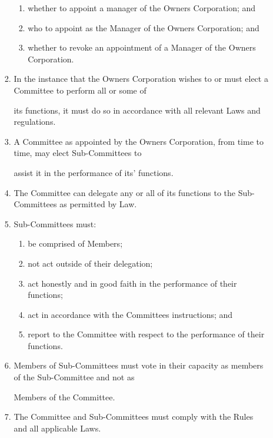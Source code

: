 \documentclass{article}
\begin{document}
\begin{enumerate}[label=\arabic*.]
\begin{enumerate}[label=\arabic{enumi}.\arabic*.]
\begin{enumerate}[label=(\arabic*)]
\begin{enumerate}[label=(\alph*)]
\item  whether to appoint a manager of the Owners Corporation; and 

\item  who to appoint as the Manager of the Owners Corporation; and 

\item  whether to revoke an appointment of a Manager of the Owners Corporation. 

\end{enumerate}
\item  In the instance that the Owners Corporation wishes to or must elect a Committee to perform all or some of 

its functions, it must do so in accordance with all relevant Laws and regulations. 

\item  A Committee as appointed by the Owners Corporation, from time to time, may elect Sub-Committees to 

assist it in the performance of its’ functions. 

\item  The Committee can delegate any or all of its functions to the Sub-Committees as permitted by Law. 

\item  Sub-Committees must: 

\begin{enumerate}[label=(\alph*)]
\item  be comprised of Members; 

\item  not act outside of their delegation; 

\item  act honestly and in good faith in the performance of their functions; 

\item  act in accordance with the Committees instructions; and 

\item  report to the Committee with respect to the performance of their functions. 

\end{enumerate}
\item  Members of Sub-Committees must vote in their capacity as members of the Sub-Committee and not as 

Members of the Committee. 

\item  The Committee and Sub-Committees must comply with the Rules and all applicable Laws. 


\end{enumerate}
\end{enumerate}
\end{enumerate}
\end{document}
